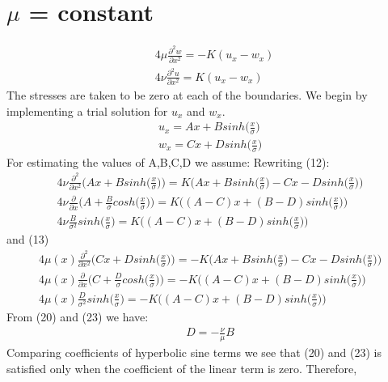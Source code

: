 \documentclass[a4paper,oneside,11pt]{report}
\begin{document}
\section*{$\mu$ = constant }
\[\boxed{\!\begin{aligned}
	&4\mu\frac{\partial^2 w}{\partial x^2} = -K(u_x - w_x) \\
	&4\nu\frac{\partial^2 u}{\partial x^2} = K(u_x - w_x)
	\end{aligned}
}
\]
The stresses are taken to be zero at each of the boundaries. We begin by implementing a trial solution for $u_x$ and $w_x$.
\begin{align*}
u_x = Ax + Bsinh \Big ( \frac{x}{\sigma} \Big )\\
w_x = Cx + Dsinh \Big ( \frac{x}{\sigma} \Big )
\end{align*}
For estimating the values of A,B,C,D we assume: 
Rewriting (12):
\begin{align*}
4\nu\frac{\partial^{2}}{\partial x^2}\Big ( Ax + Bsinh\Big ( \frac{x}{\sigma} \Big ) \Big ) = K \Big ( Ax + Bsinh \Big ( \frac{x}{\sigma} \Big ) - Cx - Dsinh \Big ( \frac{x}{\sigma} \Big )  \Big )\\
4\nu\frac{\partial}{\partial x} \Big ( A + \frac{B}{\sigma}cosh\Big ( \frac{x}{\sigma} \Big ) \Big ) = K \Big ((A - C)x + (B - D)sinh\Big ( \frac{x}{\sigma} \Big ) )\\
4\nu\frac{B}{\sigma^2} sinh\Big ( \frac{x}{\sigma} \Big ) = K \Big ( (A - C)x + (B - D)sinh\Big ( \frac{x}{\sigma} \Big )\Big )
\end{align*}
and (13)
\begin{align*}
4\mu(x)\frac{\partial^{2}}{\partial x^2}\Big ( Cx + Dsinh\Big ( \frac{x}{\sigma} \Big ) \Big ) = -K \Big ( Ax + Bsinh \Big ( \frac{x}{\sigma} \Big ) - Cx - Dsinh \Big ( \frac{x}{\sigma} \Big )  \Big )\\
4\mu(x)\frac{\partial}{\partial x} \Big ( C + \frac{D}{\sigma}cosh\Big ( \frac{x}{\sigma} \Big ) \Big ) = -K \Big ((A - C)x + (B - D)sinh\Big ( \frac{x}{\sigma} \Big ) )\\
4\mu(x)\frac{D}{\sigma^2} sinh\Big ( \frac{x}{\sigma} \Big ) = -K \Big ( (A - C)x + (B - D)sinh\Big ( \frac{x}{\sigma} \Big )\Big )
\end{align*}
From (20) and (23) we have:
\begin{align}
D = -\frac{\nu}{\mu} B
\end{align}
Comparing coefficients of hyperbolic sine terms we see that (20) and (23) is satisfied only when the coefficient of the linear term is zero. Therefore,
\end{document}
